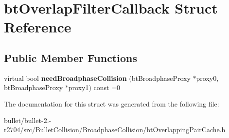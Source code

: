 \hypertarget{structbt_overlap_filter_callback}{\section{bt\+Overlap\+Filter\+Callback Struct Reference}
\label{structbt_overlap_filter_callback}
}
\subsection*{Public Member Functions}
\begin{DoxyCompactItemize}
\item 
\hypertarget{structbt_overlap_filter_callback_a4139ebc9b115ab66fb70daa31a03d177}{virtual bool {\bfseries need\+Broadphase\+Collision} (bt\+Broadphase\+Proxy $\ast$proxy0, bt\+Broadphase\+Proxy $\ast$proxy1) const =0}\label{structbt_overlap_filter_callback_a4139ebc9b115ab66fb70daa31a03d177}

\end{DoxyCompactItemize}


The documentation for this struct was generated from the following file\+:\begin{DoxyCompactItemize}
\item 
bullet/bullet-\/2.-\/r2704/src/\+Bullet\+Collision/\+Broadphase\+Collision/bt\+Overlapping\+Pair\+Cache.\+h\end{DoxyCompactItemize}
